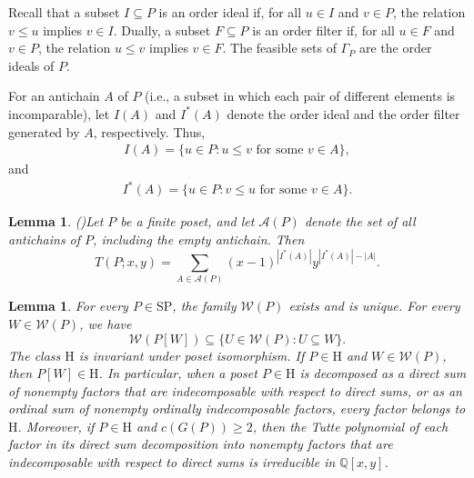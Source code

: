 \documentclass[10pt,a4paper]{amsart}
\newtheorem{lemma}[theorem]{Lemma}
\begin{document}

Recall that a subset $I\subseteq P$ is an order ideal if,
for all $u\in I$ and $v\in P$, the relation $v\leq u$ implies
$v\in I$. Dually, a subset $F\subseteq P$ is an order filter if,
for all $u\in F$ and $v\in P$, the relation $u\leq v$ implies
$v\in F$. The feasible sets of $\Gamma_P$ are the order ideals
of $P$.

For an antichain $A$ of $P$ (i.e., a subset in which each pair of different elements
is incomparable), let $I(A)$ and $I^*(A)$ denote the order ideal and the order filter generated by $A$,
respectively. Thus,
\begin{eqnarray*}
I(A)=\{u\in P:u\leq v\text{ for some }v\in A\},
\end{eqnarray*}
and
\begin{eqnarray*}
I^*(A)=\{u\in P:v\leq u\text{ for some }v\in A\}.
\end{eqnarray*}

\begin{lemma}(\cite{Gordon1993})\label{lem:antichain}
Let $P$ be a finite poset, and let $\mathcal A(P)$ denote
the set of all antichains of $P$, including the empty antichain. Then
\begin{equation}\label{eq:antichain-expansion}
T(P;x,y)=\sum_{A\in\mathcal A(P)}(x-1)^{|I^*(A)|}y^{|I^*(A)|-|A|}.
\end{equation}
\end{lemma}

\begin{lemma}\label{lem:H-inheritance}
For every $P\in\mathrm{SP}$, the family $\mathcal W(P)$
exists and is unique.
For every $W\in\mathcal W(P)$, we have
\begin{equation}\label{eq:W-inheritance}
\mathcal W(P[W])\subseteq\{U\in\mathcal W(P):U\subseteq W\}.
\end{equation}
The class $\mathrm H$ is invariant under poset isomorphism.
If $P\in\mathrm H$ and $W\in\mathcal W(P)$, then
$P[W]\in\mathrm H$.
In particular, when a poset $P\in\mathrm H$ is decomposed
as a direct sum of nonempty factors that are indecomposable
with respect to direct sums, or as an ordinal sum of nonempty
ordinally indecomposable factors, every factor belongs to $\mathrm H$.
Moreover, if $P\in\mathrm H$ and $c(G(P))\geq 2$,
then the Tutte polynomial of each factor in its direct sum
decomposition into nonempty factors that are indecomposable
with respect to direct sums is irreducible in $\mathbb Q[x,y]$.
\end{lemma}
\end{document}
